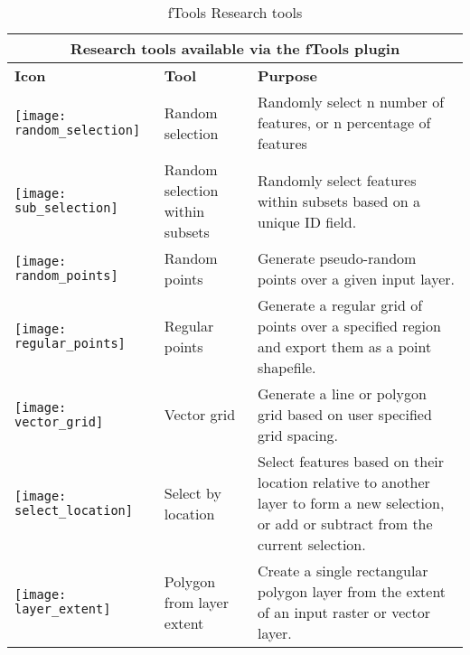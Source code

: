 \begin{table}[ht]
\centering
\caption{fTools Research tools}\label{tab:ftool_research}\medskip
 \begin{tabular}{|p{0.3in}|p{1.3in}|p{4.6in}|}
 \hline \multicolumn{3}{|c|}{\textbf{Research tools available via the fTools plugin}} \\
 \hline \textbf{Icon} & \textbf{Tool} & \textbf{Purpose} \\
 \hline \texttt{[image: random\_selection]} & Random selection & Randomly 
select n number of features, or n percentage of features \\
 \hline \texttt{[image: sub\_selection]} & Random selection within 
subsets & Randomly select features within subsets based on a unique ID field. \\
 \hline \texttt{[image: random\_points]} & Random points & Generate 
pseudo-random points over a given input layer. \\
 \hline \texttt{[image: regular\_points]} & Regular points & Generate 
a regular grid of points over a specified region and export them as a point shapefile. \\
 \hline \texttt{[image: vector\_grid]} & Vector grid & Generate a 
line or polygon grid based on user specified grid spacing. \\
 \hline \texttt{[image: select\_location]} & Select by location & 
Select features based on their location relative to another layer to form a 
new selection, or add or subtract from the current selection. \\
\hline \texttt{[image: layer\_extent]} & Polygon from layer extent & 
Create a single rectangular polygon layer from the extent of an input raster or vector layer. \\
 \hline
\end{tabular}
\end{table}

